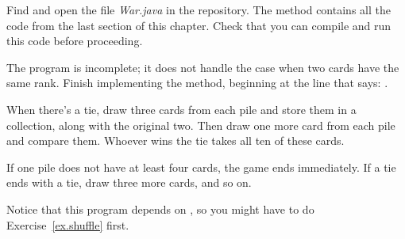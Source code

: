 \begin{exercise}  %

Find and open the file {\it War.java} in the repository.
The  method contains all the code from the last section of this chapter.
Check that you can compile and run this code before proceeding.

The program is incomplete; it does not handle the case when two cards have the same rank.
Finish implementing the  method, beginning at the line that says: .

When there's a tie, draw three cards from each pile and store them in a collection, along with the original two.
Then draw one more card from each pile and compare them.
Whoever wins the tie takes all ten of these cards.

If one pile does not have at least four cards, the game ends immediately.
If a tie ends with a tie, draw three more cards, and so on.

Notice that this program depends on , so you might have to do Exercise~\ref{ex.shuffle} first.

\end{exercise}
